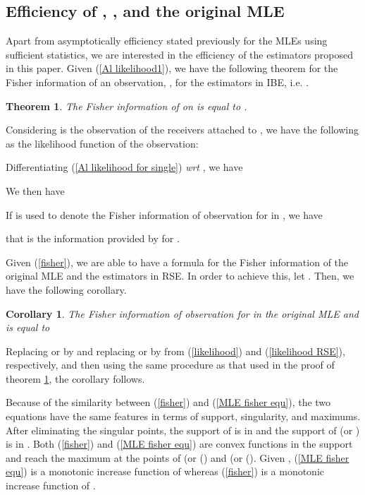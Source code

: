 \documentclass[10pt,onecolumn]{IEEEtran}
\newtheorem{theorem}{\bf Theorem}
\newtheorem{corollary}{\bf Corollary}
\begin{document}
\subsection{Efficiency of  , , and the original MLE}
Apart from  asymptotically efficiency stated previously for the MLEs using sufficient statistics, we are interested in the efficiency of the estimators proposed in this paper. Given (\ref{Al likelihood1}), we have the following theorem for the Fisher information of an observation, , for the estimators in IBE, i.e. .
\begin{theorem} \label{Al fisher}
The Fisher information of  on  is equal to .
\end{theorem}
\begin{IEEEproof}
Considering  is the observation of the receivers attached to , we have the following as the likelihood function of the observation:

Differentiating (\ref{Al likelihood for single}) {\it wrt} , we have

We then have

If  is used to denote the Fisher information of observation  for  in , we  have

that is the information provided by  for .
\end{IEEEproof}
Given (\ref{fisher}), we are able to have a formula for the Fisher information of the original MLE and the estimators in RSE. In order to achieve this, let . Then, we have the following corollary.
\begin{corollary} \label{MLE fisher}
The Fisher information of observation  for  in the original MLE and  is equal to

\end{corollary}
\begin{IEEEproof}
Replacing  or  by  and replacing  or  by  from (\ref{likelihood}) and (\ref{likelihood RSE}), respectively, and then using the same procedure as that used in the proof of theorem \ref{Al fisher}, the corollary follows.
\end{IEEEproof}
Because of the similarity between (\ref{fisher}) and (\ref{MLE fisher equ}), the two equations have the same features in terms of support, singularity, and maximums. After
eliminating the singular points, the support of  is in  and the support of  (or ) is in .
Both (\ref{fisher}) and (\ref{MLE fisher equ}) are convex functions in the support and reach the maximum at the points of   (or () and  (or ().
Given , (\ref{MLE fisher equ}) is  a monotonic increase function of  whereas (\ref{fisher}) is a monotonic increase function of . 
\end{document}
